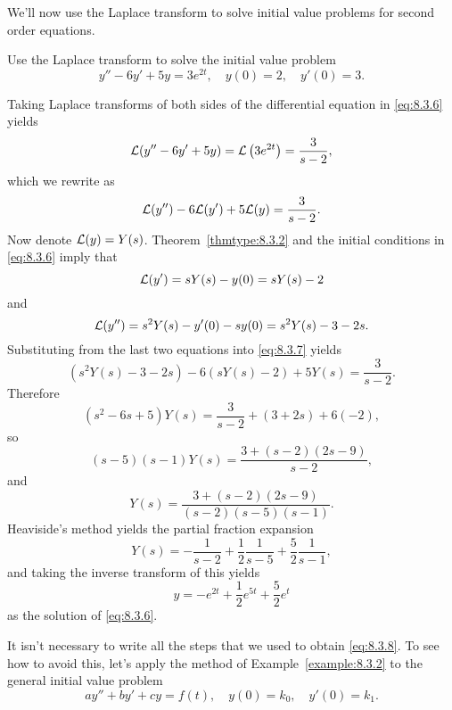 \documentclass{ximera}
\begin{document}
We'll now use the Laplace transform to solve initial value problems
for  second order equations.

\begin{example}\label{example:8.3.2}
Use the Laplace transform to solve the initial value problem
\begin{equation}\label{eq:8.3.6}
y''-6y'+5y=3e^{2t},\quad y(0)=2, \quad   y'(0)=3.
\end{equation}
\begin{explanation}
Taking Laplace transforms of both sides of the differential equation
in \eqref{eq:8.3.6} yields
$$
{\cal L}(y''-6y'+5y)={\cal L}\left(3e^{2t}\right)=\frac{3}{s-2},
$$
which we rewrite as
\begin{equation}\label{eq:8.3.7}
{\cal L}(y'')-6{\cal L}(y')+5{\cal L}(y)=\frac{3}{s-2}.
\end{equation}
Now denote ${\cal L}(y)=Y(s)$. Theorem~\ref{thmtype:8.3.2} and the
initial conditions in \eqref{eq:8.3.6} imply that
$$
{\cal L}(y')=sY(s)-y(0)=sY(s)-2
$$
and
$$
{\cal L}(y'')=s^2Y(s)-y'(0)-sy(0)=s^2Y(s)-3-2s.
$$
Substituting from the last two equations into  \eqref{eq:8.3.7} yields
$$
\left(s^2Y(s)-3-2s\right)-6\left(sY(s)-2\right)+5Y(s)=\frac{3}{s-2}.
$$
Therefore
\begin{equation}\label{eq:8.3.8}
(s^2-6s+5)Y(s)=\frac{3}{s-2}+(3+2s)+6(-2),
\end{equation}
so
$$
(s-5)(s-1)Y(s)=\frac{3+(s-2)(2s-9)}{s-2},
$$
and
$$
Y(s)=\frac{3+(s-2)(2s-9)}{(s-2)(s-5)(s-1)}.
$$
Heaviside's method yields the partial fraction expansion
$$
Y(s)=-\frac{1}{s-2}+\frac{1}{2}\frac{1}{s-5}+\frac{5}{2}\frac{1}{s-1},
$$
and taking the inverse transform of this yields
$$
y=-e^{2t}+\frac{1}{2}e^{5t}+\frac{5}{2}e^t
$$
as the solution of  \eqref{eq:8.3.6}.
\end{explanation}
\end{example}

It isn't necessary to write all the steps that we used to obtain
\eqref{eq:8.3.8}. To see how to avoid this, let's apply the method of
Example~\ref{example:8.3.2} to the general initial value problem
\begin{equation}\label{eq:8.3.9}
ay''+by'+cy=f(t), \quad  y(0)=k_0,\quad y'(0)=k_1.
\end{equation}
\end{document}
